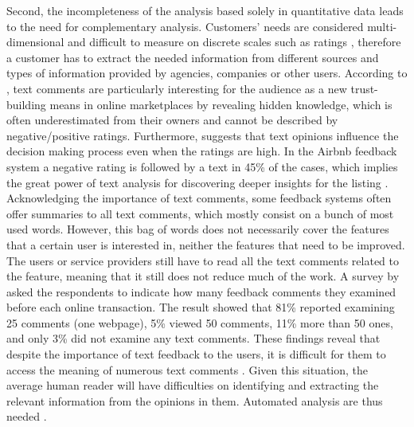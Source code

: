 %
%

Second, the incompleteness of the analysis based solely in quantitative data leads to the need for complementary analysis. Customers' needs are considered multi-dimensional and difficult to measure on discrete scales such as ratings \cite{luo2005information}, therefore a customer has to extract the needed information from different sources and types of information provided by agencies, companies or other users. According to \cite{pavlou2006nature}, text comments are particularly interesting for the audience as a new trust-building means in online marketplaces by revealing hidden knowledge, which is often underestimated from their owners and cannot be described by negative/positive ratings. Furthermore, \cite{fradkin2016bias} suggests that text opinions influence the decision making process even when the ratings are high. In the Airbnb feedback system a negative rating is followed by a text in 45\% of the cases, which implies the great power of text analysis for discovering deeper insights for the listing \cite{fradkin2016bias}. Acknowledging the importance of text comments, some feedback systems often offer summaries to all text comments, which mostly consist on a bunch of most used words. However, this bag of words does not necessarily cover the features that a certain user is interested in, neither the features that need to be improved. The users or service providers still have to read all the text comments related to the feature, meaning that it still does not reduce much of the  work. A survey by \cite{pavlou2006institutional} asked the respondents to indicate how many feedback comments they examined before each online transaction. The result showed that 81\% reported examining 25 comments (one webpage), 5\% viewed 50 comments, 11\% more than 50 ones, and only 3\% did not examine any text comments. These findings reveal that despite the importance of text feedback to the users, it is difficult for them to access the meaning of numerous text comments \cite{pavlou2006institutional}. Given this situation, the average human reader will have difficulties on identifying and extracting the relevant information from the opinions in them. Automated analysis are thus needed \cite{liu2012sentiment}.
